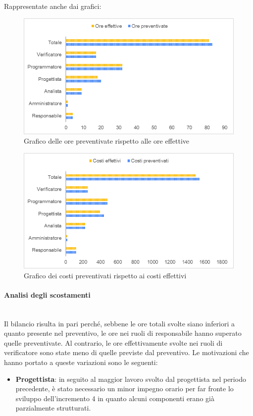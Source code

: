 Rappresentate anche dai grafici:
\begin{figure} [H]
	\includegraphics[width=\linewidth]{./img/Grafici/33.png}
	\caption{Grafico delle ore preventivate rispetto alle ore effettive}
\end{figure}

\begin{figure} [H]
	\includegraphics[width=\linewidth]{./img/Grafici/34.png}
	\caption{Grafico dei costi preventivati rispetto ai costi effettivi}
\end{figure}

\paragraph*{Analisi degli scostamenti} \mbox{} \\
Il bilancio risulta in pari perché, sebbene le ore totali svolte siano inferiori a quanto presente nel preventivo, le ore nei ruoli di responsabile hanno superato quelle preventivate. Al contrario, le ore effettivamente svolte nei ruoli di verificatore sono state meno di quelle previste dal preventivo.
Le motivazioni che hanno portato a queste variazioni sono le seguenti:
\begin{itemize}
	\item \textbf{Progettista}: in seguito al maggior lavoro svolto dal progettista nel periodo precedente, è stato necessario un minor impegno orario per far fronte lo sviluppo dell'incremento 4 in quanto alcuni componenti erano già parzialmente strutturati.
\end{itemize}

